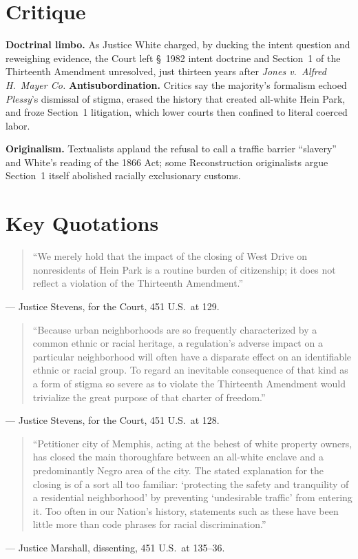 \documentclass[12pt]{article}
\begin{document}
\section{Critique}

\textbf{Doctrinal limbo.} As Justice White charged, by ducking the intent question and reweighing evidence, the Court left \S~1982 intent doctrine and Section~1 of the Thirteenth Amendment unresolved, just thirteen years after \textit{Jones v.\ Alfred H.\ Mayer Co.} \textbf{Antisubordination.} Critics say the majority's formalism echoed \textit{Plessy}'s dismissal of stigma, erased the history that created all-white Hein Park, and froze Section~1 litigation, which lower courts then confined to literal coerced labor.

\textbf{Originalism.} Textualists applaud the refusal to call a traffic barrier ``slavery'' and White's reading of the 1866 Act; some Reconstruction originalists argue Section~1 itself abolished racially exclusionary customs.

\section{Key Quotations}

\begin{quote}
``We merely hold that the impact of the closing of West Drive on nonresidents of Hein Park is a routine burden of citizenship; it does not reflect a violation of the Thirteenth Amendment.''
\end{quote}
\noindent --- Justice Stevens, for the Court, 451 U.S.\ at 129.

\begin{quote}
``Because urban neighborhoods are so frequently characterized by a common ethnic or racial heritage, a regulation's adverse impact on a particular neighborhood will often have a disparate effect on an identifiable ethnic or racial group. To regard an inevitable consequence of that kind as a form of stigma so severe as to violate the Thirteenth Amendment would trivialize the great purpose of that charter of freedom.''
\end{quote}
\noindent --- Justice Stevens, for the Court, 451 U.S.\ at 128.

\begin{quote}
``Petitioner city of Memphis, acting at the behest of white property owners, has closed the main thoroughfare between an all-white enclave and a predominantly Negro area of the city. The stated explanation for the closing is of a sort all too familiar: `protecting the safety and tranquility of a residential neighborhood' by preventing `undesirable traffic' from entering it. Too often in our Nation's history, statements such as these have been little more than code phrases for racial discrimination.''
\end{quote}
\noindent --- Justice Marshall, dissenting, 451 U.S.\ at 135--36.
\end{document}
